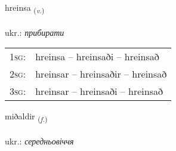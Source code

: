 \documentclass[frontgrid, backgrid]{flacards}\usepackage[]{graphicx}\usepackage[]{xcolor}
\begin{document}
\renewcommand{\flhead}{\vskip5pt \fboxsep=0pt {\small\bfseries\footnotesize Sagnorð | дієслово}}
\renewcommand{\fcfoot}{\vskip5pt \fboxsep=0pt \hspace{2pt}{\small\bfseries\footnotesize 3K}}

\renewcommand{\blhead}{\vskip5pt {\small\bfseries\footnotesize Sagnorð | дієслово }}
\renewcommand{\bcfoot}{\vskip5pt \hspace{2pt}{\small\bfseries\footnotesize 3K}}


{hreinsa \small{\textsubscript{(\textit{v.})}} \\[1ex] %
\textphonetic{[r̥einsa]} \\
ukr.: \emph{прибирати} \\  [2ex]
\renewcommand*{\arraystretch}{0.8}
\begin{tabular}{p{1cm}l}
\textsc{1sg}: & hreinsa -- hreinsaði -- hreinsað \\ 
\textsc{2sg}: & hreinsar -- hreinsaðir -- hreinsað \\ 
\textsc{3sg}: & hreinsar -- hreinsaði -- hreinsað \\ 
\end{tabular}
}

\renewcommand{\flhead}{\vskip5pt \fboxsep=0pt {\small\bfseries\footnotesize Nafnorð | іменник}}
\renewcommand{\fcfoot}{\vskip5pt \fboxsep=0pt \hspace{2pt}{\small\bfseries\footnotesize 3K}}

\renewcommand{\blhead}{\vskip5pt {\small\bfseries\footnotesize Nafnorð | іменник }}
\renewcommand{\bcfoot}{\vskip5pt \hspace{2pt}{\small\bfseries\footnotesize 3K}}


{miðaldir \small{\textsubscript{(\textit{f.})}} \\[1ex] %
\textphonetic{[mɪːðaltɪr]} \\
ukr.: \emph{середньовіччя} \\  [2ex]
\renewcommand*{\arraystretch}{0.8}
}
\end{document}
